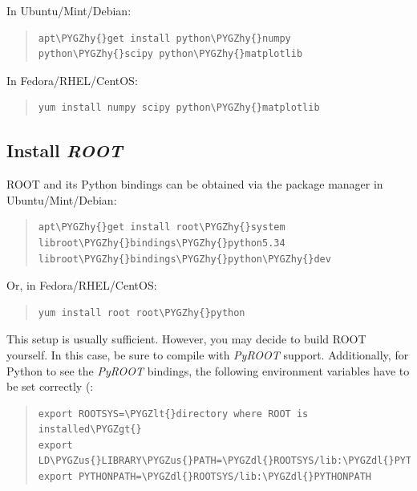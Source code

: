 \documentclass[a4paper,10pt,english]{sphinxmanual}
\def\PYGZus{\char`\_}
\def\PYGZlt{\char`\<}
\def\PYGZgt{\char`\>}
\def\PYGZdl{\char`\$}
\def\PYGZhy{\char`\-}
\begin{document}
In Ubuntu/Mint/Debian:
\begin{quote}

\begin{Verbatim}[commandchars=\\\{\}]
apt\PYGZhy{}get install python\PYGZhy{}numpy python\PYGZhy{}scipy python\PYGZhy{}matplotlib
\end{Verbatim}
\end{quote}

In Fedora/RHEL/CentOS:
\begin{quote}

\begin{Verbatim}[commandchars=\\\{\}]
yum install numpy scipy python\PYGZhy{}matplotlib
\end{Verbatim}
\end{quote}


\subsection{Install \emph{ROOT}}
\label{installation:install-root}
ROOT and its Python bindings can be obtained via the package manager in
Ubuntu/Mint/Debian:
\begin{quote}

\begin{Verbatim}[commandchars=\\\{\}]
apt\PYGZhy{}get install root\PYGZhy{}system libroot\PYGZhy{}bindings\PYGZhy{}python5.34 libroot\PYGZhy{}bindings\PYGZhy{}python\PYGZhy{}dev
\end{Verbatim}
\end{quote}

Or, in Fedora/RHEL/CentOS:
\begin{quote}

\begin{Verbatim}[commandchars=\\\{\}]
yum install root root\PYGZhy{}python
\end{Verbatim}
\end{quote}

This setup is usually sufficient. However, you may decide to build ROOT yourself. In this case,
be sure to compile with \emph{PyROOT} support. Additionally, for Python to see the \emph{PyROOT} bindings,
the following environment variables have to be set correctly (:
\begin{quote}

\begin{Verbatim}[commandchars=\\\{\}]
export ROOTSYS=\PYGZlt{}directory where ROOT is installed\PYGZgt{}
export LD\PYGZus{}LIBRARY\PYGZus{}PATH=\PYGZdl{}ROOTSYS/lib:\PYGZdl{}PYTHONDIR/lib:\PYGZdl{}LD\PYGZus{}LIBRARY\PYGZus{}PATH
export PYTHONPATH=\PYGZdl{}ROOTSYS/lib:\PYGZdl{}PYTHONPATH
\end{Verbatim}
\end{quote}
\end{document}
